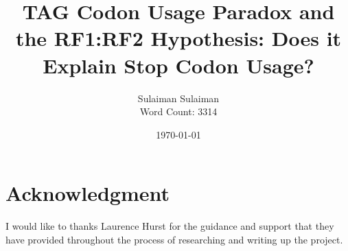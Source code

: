 \documentclass[
    emulatestandardclasses,
    parskip=half,
]{scrartcl}
\begin{document}
    \title{TAG Codon Usage Paradox and the RF1:RF2 Hypothesis: Does it Explain Stop Codon Usage?}
    \date{\today}
    \author{Sulaiman Sulaiman \\ Word Count: 3314}
    \maketitle

    
    

    \pagebreak
    
    
    \pagebreak
    \pagebreak\section*{Acknowledgment}
        I would like to thanks Laurence Hurst for the guidance and support that they have provided throughout the process of researching and writing up the project.

	\newpage {}
    \newrefcontext[sorting=nyt]
    \nocite{anaconda,SciPy,NumPy,pandas,biopython,statsmodels,matplotlib,R,tidyverse,ggrepel,tqdm,gffutils}
	\printbibliography[notkeyword=software]
	\printbibliography[keyword=software, title={Software \& Libraries}]
\end{document}
